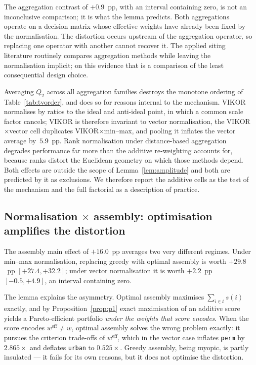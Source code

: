 The aggregation contrast of $+0.9$~pp, with an interval containing
zero, is not an inconclusive comparison; it is what the lemma predicts.
Both aggregations operate on a decision matrix whose effective weights
have already been fixed by the normalisation.
The distortion occurs upstream of the aggregation operator, so replacing
one operator with another cannot recover it.
The applied siting literature routinely compares aggregation methods
while leaving the normalisation implicit; on this evidence that is a
comparison of the least consequential design choice.

\begin{remark}
\label{rem:pooling}
Averaging $Q_2$ across all aggregation families destroys the monotone
ordering of Table~\ref{tab:tvorder}, and does so for reasons internal to
the mechanism.
VIKOR normalises by ratios to the ideal and anti-ideal point, in which
a common scale factor cancels; VIKOR is therefore invariant to vector
normalisation, the VIKOR$\times$vector cell duplicates
VIKOR$\times$min--max, and pooling it inflates the vector average
by~$5.9$~pp.
Rank normalisation under distance-based aggregation degrades performance
far more than the additive re-weighting accounts for, because ranks
distort the Euclidean geometry on which those methods depend.
Both effects are outside the scope of Lemma~\ref{lem:amplitude} and
both are predicted by it as exclusions.
We therefore report the additive cells as the test of the mechanism and
the full factorial as a description of practice.
\end{remark}

\subsection{Normalisation \texorpdfstring{$\times$}{x} assembly:
  optimisation amplifies the distortion}
\label{sec:interaction}

The assembly main effect of $+16.0$~pp averages two very different
regimes.
Under min--max normalisation, replacing greedy with optimal assembly is
worth $+29.8$~pp $[+27.4,+32.2]$; under vector normalisation it is
worth $+2.2$~pp $[-0.5,+4.9]$, an interval containing zero.

The lemma explains the asymmetry.
Optimal assembly maximises $\sum_{i\in t}s(i)$ exactly, and by
Proposition~\ref{prop:p1} exact maximisation of an additive score yields
a Pareto-efficient portfolio \emph{under the weights that score
encodes}.
When the score encodes $w^{\mathrm{eff}}\neq w$, optimal assembly
solves the wrong problem exactly: it pursues the criterion trade-offs of
$w^{\mathrm{eff}}$, which in the vector case inflates \texttt{perm}
by $2.865\times$ and deflates \texttt{urban} to $0.525\times$.
Greedy assembly, being myopic, is partly insulated --- it fails for its
own reasons, but it does not optimise the distortion.

